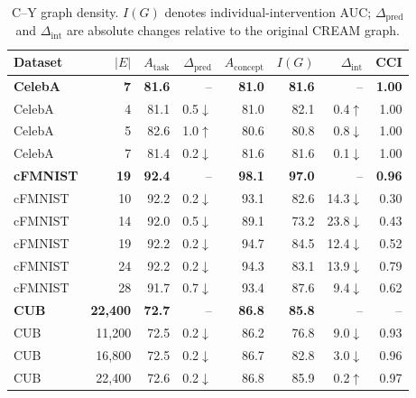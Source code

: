\begin{table}[t]
\centering
\caption{C--Y graph density. $I(G)$ denotes individual-intervention AUC; $\Delta_{\mathrm{pred}}$ and $\Delta_{\mathrm{int}}$ are absolute changes relative to the original CREAM graph.}
\label{tab:cy_density}
\small
\setlength{\tabcolsep}{6pt}
\begin{tabular}{lrrrrrrr}
\toprule
Dataset & $|E|$ & $A_{\mathrm{task}}$ & $\Delta_{\mathrm{pred}}$ & $A_{\mathrm{concept}}$ & $I(G)$ & $\Delta_{\mathrm{int}}$ & CCI \\
\midrule
\rowcolor{gray!15}
\textbf{CelebA} & \textbf{7} & \textbf{81.6} & -- & \textbf{81.0} & \textbf{81.6} & -- & \textbf{1.00} \\
CelebA & 4 & 81.1 & 0.5$\downarrow$ & 81.0 & 82.1 & 0.4$\uparrow$ & 1.00 \\
CelebA & 5 & 82.6 & 1.0$\uparrow$ & 80.6 & 80.8 & 0.8$\downarrow$ & 1.00 \\
CelebA & 7 & 81.4 & 0.2$\downarrow$ & 81.6 & 81.6 & 0.1$\downarrow$ & 1.00 \\
\midrule
\rowcolor{gray!15}
\textbf{cFMNIST} & \textbf{19} & \textbf{92.4} & -- & \textbf{98.1} & \textbf{97.0} & -- & \textbf{0.96} \\
cFMNIST & 10 & 92.2 & 0.2$\downarrow$ & 93.1 & 82.6 & 14.3$\downarrow$ & 0.30 \\
cFMNIST & 14 & 92.0 & 0.5$\downarrow$ & 89.1 & 73.2 & 23.8$\downarrow$ & 0.43 \\
cFMNIST & 19 & 92.2 & 0.2$\downarrow$ & 94.7 & 84.5 & 12.4$\downarrow$ & 0.52 \\
cFMNIST & 24 & 92.2 & 0.2$\downarrow$ & 94.3 & 83.1 & 13.9$\downarrow$ & 0.79 \\
cFMNIST & 28 & 91.7 & 0.7$\downarrow$ & 93.4 & 87.6 & 9.4$\downarrow$ & 0.62 \\
\midrule
\rowcolor{gray!15}
\textbf{CUB} & \textbf{22,400} & \textbf{72.7} & -- & \textbf{86.8} & \textbf{85.8} & -- & -- \\
CUB & 11,200 & 72.5 & 0.2$\downarrow$ & 86.2 & 76.8 & 9.0$\downarrow$ & 0.93 \\
CUB & 16,800 & 72.5 & 0.2$\downarrow$ & 86.7 & 82.8 & 3.0$\downarrow$ & 0.96 \\
CUB & 22,400 & 72.6 & 0.2$\downarrow$ & 86.8 & 85.9 & 0.2$\uparrow$ & 0.97 \\
\bottomrule
\end{tabular}
\end{table}
